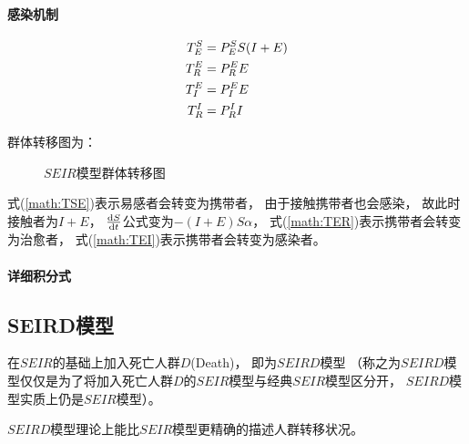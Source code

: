 \paragraph{感染机制}
\begin{align}
    T^{S}_{E}&=P^{S}_{E}S(I+E) \label{math:TSE} \\
    T^{E}_{R}&=P^{E}_{R}E     \label{math:TER}  \\
    T^{E}_{I}&=P^{E}_{I}E     \label{math:TEI}  \\
    T^{I}_{R}&=P^{I}_{R}I
\end{align}
\par 群体转移图为：
\begin{figure}[H]
    \centering
    \caption{$SEIR$模型群体转移图}
\end{figure}
\par 式(\ref{math:TSE})表示易感者会转变为携带者，
由于接触携带者也会感染，
故此时接触者为$I+E$，
$\frac{\mathrm{d}S}{\mathrm{d}t}$公式变为$-(I+E)S\alpha$，
式(\ref{math:TER})表示携带者会转变为治愈者，
式(\ref{math:TEI})表示携带者会转变为感染者。
\paragraph{详细积分式}
\SEIR
\subsection{SEIRD模型}
\par 在$SEIR$的基础上加入死亡人群$D$(Death)，
即为$SEIRD$模型
（称之为$SEIRD$模型仅仅是为了将加入死亡人群$D$的$SEIR$模型与经典$SEIR$模型区分开，
$SEIRD$模型实质上仍是$SEIR$模型）。
\par $SEIRD$模型理论上能比$SEIR$模型更精确的描述人群转移状况。
